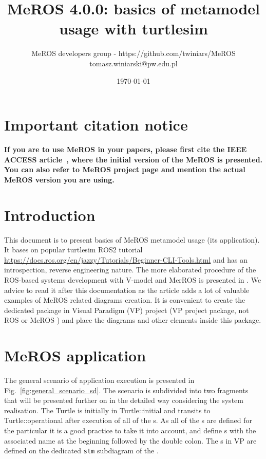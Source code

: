 \documentclass[11pt,oneside,a4paper]{report}
\begin{document}
	
\title{MeROS 4.0.0: basics of metamodel usage with turtlesim}
\author{MeROS developers group - https://github.com/twiniars/MeROS \\ tomasz.winiarski@pw.edu.pl}
\date{\today}
\maketitle

	
\chapter*{Important citation notice}

\textbf{If you are to use MeROS in your papers, please first cite the IEEE ACCESS  article~\cite{meros-access}, where the initial version of the MeROS is presented. You can also refer to MeROS project page \cite{meros-www} and mention the actual MeROS version you are using.}
	
\chapter{Introduction}
\label{ch:introduction}

	This document is to present basics of MeROS metamodel usage (its application). It bases on popular turtlesim ROS2 tutorial \url{https://docs.ros.org/en/jazzy/Tutorials/Beginner-CLI-Tools.html} and has an introspection, reverse engineering nature. The more elaborated procedure of the ROS-based systems development with V-model and MerROS is presented in \cite{winiarski2025-v-model}. We advice to read it after this documentation as the article adds a lot of valuable examples of MeROS related diagrams creation. It is convenient to create the dedicated package in Visual Paradigm (VP) project (VP project package, not ROS or MeROS \stPackage{}) and place the diagrams and other elements inside this package.

\chapter{MeROS application}
\label{ch:application}

The general scenario of application execution is presented in Fig.~\ref{fig:general_scenario_sd}. The scenario is subdivided into two fragments that will be presented further on in the detailed way considering the system realisation. The \textsf{Turtle} \stSystem{} is initially in \textsf{Turtle::initial} \stSystemState{} and transits to \textsf{Turtle::operational} \stSystemState{} after execution of all of the \stNode{}s. As all of the \stSystemState{}s are defined for the particular \stSystem{} it is a good practice to take it into account, and define \stSystemState{}s with the associated \stSystem{} name at the beginning followed by the double colon. The \stSystemState{}s in VP are defined on the dedicated \texttt{stm} subdiagram of the \stSystem{}.
\end{document}

